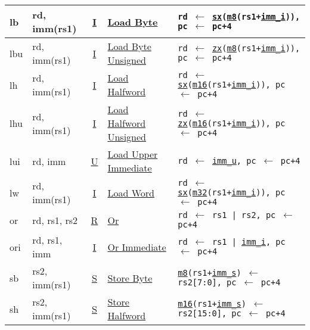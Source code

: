 {\begin{tabular}{|ll|c|l|l|}
\hline
lb    & rd, imm(rs1)  & \hyperref[insnformat:itype]{I} & \hyperref[insn:lb]{Load Byte}                   & {\tt rd $\leftarrow$ \hyperref[extension:sx]{sx}(\hyperref[memory:m8]{m8}(rs1+\hyperref[imm.i:decode]{imm\_i})), pc $\leftarrow$ pc+4}\\
\hline
lbu   & rd, imm(rs1)  & \hyperref[insnformat:itype]{I} & \hyperref[insn:lbu]{Load Byte Unsigned}         & {\tt rd $\leftarrow$ \hyperref[extension:zx]{zx}(\hyperref[memory:m8]{m8}(rs1+\hyperref[imm.i:decode]{imm\_i})), pc $\leftarrow$ pc+4}\\
\hline
lh    & rd, imm(rs1)  & \hyperref[insnformat:itype]{I} & \hyperref[insn:lh]{Load Halfword}               & {\tt rd $\leftarrow$ \hyperref[extension:sx]{sx}(\hyperref[memory:m16]{m16}(rs1+\hyperref[imm.i:decode]{imm\_i})), pc $\leftarrow$ pc+4}\\
\hline
lhu   & rd, imm(rs1)  & \hyperref[insnformat:itype]{I} & \hyperref[insn:lhu]{Load Halfword Unsigned}     & {\tt rd $\leftarrow$ \hyperref[extension:zx]{zx}(\hyperref[memory:m16]{m16}(rs1+\hyperref[imm.i:decode]{imm\_i})), pc $\leftarrow$ pc+4}\\
\hline
lui   & rd, imm        & \hyperref[insnformat:utype]{U} & \hyperref[insn:lui]{Load Upper Immediate}        & {\tt rd $\leftarrow$ \hyperref[imm.u:decode]{imm\_u}, pc $\leftarrow$ pc+4}\\
\hline
lw    & rd, imm(rs1)  & \hyperref[insnformat:itype]{I} & \hyperref[insn:lw]{Load Word}                   & {\tt rd $\leftarrow$ \hyperref[extension:sx]{sx}(\hyperref[memory:m32]{m32}(rs1+\hyperref[imm.i:decode]{imm\_i})), pc $\leftarrow$ pc+4}\\
\hline
or    & rd, rs1, rs2   & \hyperref[insnformat:rtype]{R} & \hyperref[insn:or]{Or}                         & {\tt rd $\leftarrow$ rs1 | rs2, pc $\leftarrow$ pc+4}\\
\hline
ori   & rd, rs1, imm  & \hyperref[insnformat:itype]{I} & \hyperref[insn:ori]{Or Immediate}               & {\tt rd $\leftarrow$ rs1 | \hyperref[imm.i:decode]{imm\_i}, pc $\leftarrow$ pc+4}\\
\hline
sb    & rs2, imm(rs1) & \hyperref[insnformat:stype]{S} & \hyperref[insn:sb]{Store Byte}                  & {\tt \hyperref[memory:m8]{m8}(rs1+\hyperref[imm.s:decode]{imm\_s}) $\leftarrow$ rs2[7:0], pc $\leftarrow$ pc+4}\\
\hline
sh    & rs2, imm(rs1) & \hyperref[insnformat:stype]{S} & \hyperref[insn:sh]{Store Halfword}              & {\tt \hyperref[memory:m16]{m16}(rs1+\hyperref[imm.s:decode]{imm\_s}) $\leftarrow$ rs2[15:0], pc $\leftarrow$ pc+4}\\

\end{tabular}}
